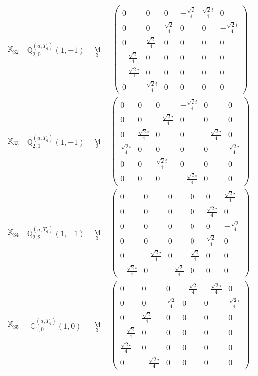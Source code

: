 \documentclass[fleqn,10pt,landscape]{article}
\begin{document}
\begin{itemize}
\begin{center}
\begin{longtable}{c|c|c|c}
$ \mathbb{X}_{32} $ & $\mathbb{Q}_{2,0}^{(a,T_{g})}(1,-1)$ & M$_{3}$ & $\begin{pmatrix} 0 & 0 & 0 & - \frac{\sqrt{2}}{4} & \frac{\sqrt{2} i}{4} & 0 \\ 0 & 0 & \frac{\sqrt{2}}{4} & 0 & 0 & - \frac{\sqrt{2} i}{4} \\ 0 & \frac{\sqrt{2}}{4} & 0 & 0 & 0 & 0 \\ - \frac{\sqrt{2}}{4} & 0 & 0 & 0 & 0 & 0 \\ - \frac{\sqrt{2} i}{4} & 0 & 0 & 0 & 0 & 0 \\ 0 & \frac{\sqrt{2} i}{4} & 0 & 0 & 0 & 0 \end{pmatrix}$ \\
$ \mathbb{X}_{33} $ & $\mathbb{Q}_{2,1}^{(a,T_{g})}(1,-1)$ & M$_{3}$ & $\begin{pmatrix} 0 & 0 & 0 & - \frac{\sqrt{2} i}{4} & 0 & 0 \\ 0 & 0 & - \frac{\sqrt{2} i}{4} & 0 & 0 & 0 \\ 0 & \frac{\sqrt{2} i}{4} & 0 & 0 & - \frac{\sqrt{2} i}{4} & 0 \\ \frac{\sqrt{2} i}{4} & 0 & 0 & 0 & 0 & \frac{\sqrt{2} i}{4} \\ 0 & 0 & \frac{\sqrt{2} i}{4} & 0 & 0 & 0 \\ 0 & 0 & 0 & - \frac{\sqrt{2} i}{4} & 0 & 0 \end{pmatrix}$ \\
$ \mathbb{X}_{34} $ & $\mathbb{Q}_{2,2}^{(a,T_{g})}(1,-1)$ & M$_{3}$ & $\begin{pmatrix} 0 & 0 & 0 & 0 & 0 & \frac{\sqrt{2} i}{4} \\ 0 & 0 & 0 & 0 & \frac{\sqrt{2} i}{4} & 0 \\ 0 & 0 & 0 & 0 & 0 & - \frac{\sqrt{2}}{4} \\ 0 & 0 & 0 & 0 & \frac{\sqrt{2}}{4} & 0 \\ 0 & - \frac{\sqrt{2} i}{4} & 0 & \frac{\sqrt{2}}{4} & 0 & 0 \\ - \frac{\sqrt{2} i}{4} & 0 & - \frac{\sqrt{2}}{4} & 0 & 0 & 0 \end{pmatrix}$ \\
$ \mathbb{X}_{35} $ & $\mathbb{G}_{1,0}^{(a,T_{g})}(1,0)$ & M$_{3}$ & $\begin{pmatrix} 0 & 0 & 0 & - \frac{\sqrt{2}}{4} & - \frac{\sqrt{2} i}{4} & 0 \\ 0 & 0 & \frac{\sqrt{2}}{4} & 0 & 0 & \frac{\sqrt{2} i}{4} \\ 0 & \frac{\sqrt{2}}{4} & 0 & 0 & 0 & 0 \\ - \frac{\sqrt{2}}{4} & 0 & 0 & 0 & 0 & 0 \\ \frac{\sqrt{2} i}{4} & 0 & 0 & 0 & 0 & 0 \\ 0 & - \frac{\sqrt{2} i}{4} & 0 & 0 & 0 & 0 \end{pmatrix}$ \\

\end{longtable}
\end{center}
\end{itemize}
\end{document}
